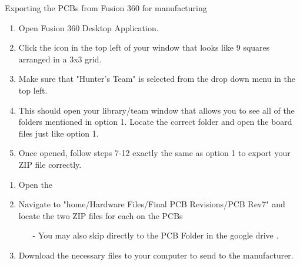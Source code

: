 \begin{subsubsec}{Exporting the PCBs from Fusion 360 for manufacturing}
\vspace{1em}



\begin{enumerate}   %
    \item Open Fusion 360 Desktop Application.
    \item Click the icon in the top left of your window that looks like 9 squares arranged in a 3x3 grid.
    \item Make sure that "Hunter's Team" is selected from the drop down menu in the top left. 
    \item This should open your library/team window that allows you to see all of the folders mentioned in option 1. Locate the correct folder and open the board files just like option 1. 
    \item Once opened, follow steps 7-12 exactly the same as option 1 to export your ZIP file correctly.
\end{enumerate}

\vspace{1em}
\begin{enumerate}
    \item Open the 
    \item Navigate to "home/Hardware Files/Final PCB Revisions/PCB Rev7" and locate the two ZIP files for each on the PCBs
    \begin{itemize}
        \item[-] You may also skip directly to the PCB Folder in the google drive .
    \end{itemize}
    \item Download the necessary files to your computer to send to the manufacturer. 
\end{enumerate}


\end{subsubsec}
